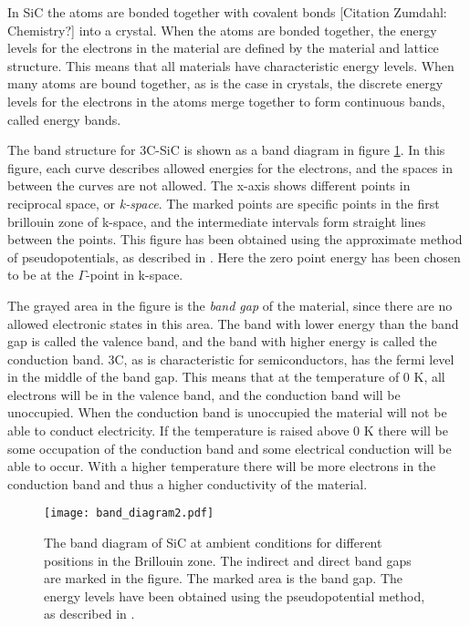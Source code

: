 In SiC the atoms are bonded together with covalent bonds [Citation Zumdahl: Chemistry?] into a crystal. When the atoms are bonded together, the energy levels for the electrons in the material are defined by the material and lattice structure. This means that all materials have characteristic energy levels. When many atoms are bound together, as is the case in crystals, the discrete energy levels for the electrons in the atoms merge together to form continuous bands, called energy bands. 

The band structure for 3C-SiC is shown as a band diagram in figure \ref{fig:band}. In this figure, each curve describes allowed energies for the electrons, and the spaces in between the curves are not allowed. The x-axis shows different points in reciprocal space, or \emph{k-space}. The marked points are specific points in the first brillouin zone of k-space, and the intermediate intervals form straight lines between the points. This figure has been obtained using the approximate method of pseudopotentials, as described in \cite{Aourag1994}. Here the zero point energy has been chosen to be at the $\Gamma$-point in k-space. 

The grayed area in the figure is the \emph{band gap} of the material, since there are no allowed electronic states in this area. The band with lower energy than the band gap is called the valence band, and the band with higher energy is called the conduction band. 3C, as is characteristic for semiconductors, has the fermi level in the middle of the band gap. This means that at the temperature of 0 K, all electrons will be in the valence band, and the conduction band will be unoccupied. When the conduction band is unoccupied the material will not be able to conduct electricity. If the temperature is raised above 0 K there will be some occupation of the conduction band and some electrical conduction will be able to occur. With a higher temperature there will be more electrons in the conduction band and thus a higher conductivity of the material. 

\begin{figure}[h]
\begin{center}
\texttt{[image: band\_diagram2.pdf]}
\caption{The band diagram of SiC at ambient conditions for different positions in the Brillouin zone. The indirect and direct band gaps are marked in the figure. The marked area is the band gap. The energy levels have been obtained using the pseudopotential method, as described in \cite{Aourag1994}.
\label{fig:band}}
\end{center}
\end{figure}

